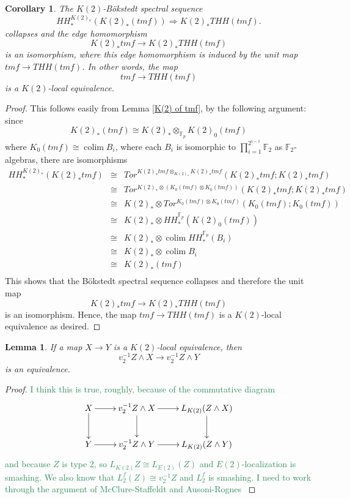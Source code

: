 \documentclass[12pt]{amsart}
\DeclareMathOperator*{\colim}{colim}
\newtheorem{cor}[equation]{Corollary}
\newtheorem{lem}[equation]{Lemma}
\theoremstyle{definition}
\numberwithin{equation}{section}
\numberwithin{figure}{section}
\begin{document}
\begin{cor}
The $K(2)$-B\"okstedt spectral sequence 
\begin{equation}\label{Bok ss} HH_*^{K(2)_*}(K(2)_*(tmf))\Rightarrow K(2)_*THH(tmf).\end{equation}
collapses and the edge homomorphism 
\[ K(2)_*tmf\rightarrow K(2)_*THH(tmf)\]
is an isomorphism, where this edge homomorphism is induced by the unit map $tmf\rightarrow THH(tmf)$. In other words, the map 
\[ tmf \rightarrow THH(tmf)\]
is a $K(2)$-local equivalence. 
\end{cor}
\begin{proof}
This follows easily from Lemma \ref{K(2) of tmf}, by the following argument: since
\begin{equation} 
K(2)_*(tmf)\cong K(2)_*\otimes_{\mathbb{F}_p} K(2)_0(tmf)
\end{equation}
where $K_0(tmf)\cong \colim B_i$, where each $B_i$ is isomorphic to $\prod_{i=1}^{2^{i-1}}\mathbb{F}_2$ as $\mathbb{F}_2$-algebras, there are isomorphisms
\[ 
\begin{array}{rcl}
HH_*^{K(2)_*}(K(2)_*tmf)&\cong & Tor^{K(2)_*tmf\otimes_{K(2)_*} K(2)_*tmf}(K(2)_*tmf;K(2)_*tmf) \\
  &\cong & Tor^{K(2)_*\otimes (K_0(tmf)\otimes K_0(tmf))}(K(2)_*tmf;K(2)_*tmf) \\
  &\cong & K(2)_*\otimes Tor^{K_0(tmf)\otimes K_0(tmf)}(K_0(tmf); K_0(tmf))\\
&\cong & K(2)_*\otimes HH_*^{\mathbb{F}_p}(K(2)_0(tmf))\\
&\cong& K(2)_*\otimes \colim HH_*^{\mathbb{F}_p}(B_i)\\
&\cong &  K(2)_*\otimes \colim  B_i\\
&\cong & K(2)_*(tmf)\\
\end{array}
\]
This shows that the B\"okstedt spectral sequence collapses and therefore the unit map 
\[ K(2)_*tmf\rightarrow K(2)_*THH(tmf) \]
is an isomorphism. Hence, the map $tmf\rightarrow THH(tmf)$ is a $K(2)$-local equivalence as desired. 
\end{proof}
\begin{lem}
If a map $X\rightarrow Y$ is a $K(2)$-local equivalence, then 
\[ v_2^{-1}Z\wedge X\rightarrow v_2^{-1}Z\wedge Y\]
is an equivalence. 
\end{lem}
\begin{proof}
\textcolor{seagreen}{
I think this is true, roughly, because of the commutative diagram 
\[ 
\xymatrix{ 
X\ar[d] \ar[r] & v_2^{-1}Z\wedge  X \ar[d] \ar[r] & L_{K(2)}(Z\wedge  X)\ar[d] \\
Y \ar[r] & v_2^{-1}Z\wedge  Y \ar[r] & L_{K(2)}(Z\wedge  Y)
}
\]
and because $Z$ is type $2$, so $L_{K(2)}Z\cong L_{E(2)}(Z)$ and $E(2)$-localization is smashing. We also know that $L_2^f(Z)\cong v_2^{-1}Z$ and $L_2^f$ is smashing. 
I need to work through the argument of McClure-Staffeldt and Ausoni-Rognes
}
\end{proof}
\end{document}
